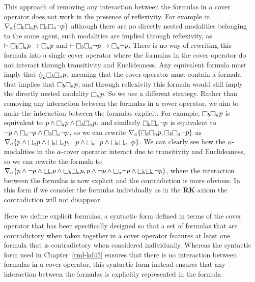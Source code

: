 This approach of removing any interaction between the formulas in a cover operator does not work in the presence of reflexivity.
For example in $\coversA \{\necessaryB \necessaryA \atomP, \necessaryB \necessaryA \lnot \atomP\}$ although there are no directly nested modalities belonging to the same agent, such modalities are implied through reflexivity, as $\proves \necessaryB \necessaryA \atomP \implies \necessaryA \atomP$ and $\proves \necessaryB \necessaryA \lnot \atomP \implies \necessaryA \lnot \atomP$.
There is no way of rewriting this formula into a single cover operator where the formulas in the cover operator do not interact through transitivity and Euclideaness. 
Any equivalent formula must imply that $\possibleA \necessaryB \necessaryA \atomP$, meaning that the cover operator must contain a formula that implies that $\necessaryB \necessaryA \atomP$, and through reflexivity this formula would still imply the directly nested modality $\necessaryA \atomP$.
So we use a different strategy.
Rather than removing any interaction between the formulas in a cover operator, we aim to make the interaction between the formulas explicit.
For example, $\necessaryB \necessaryA \atomP$ is equivalent to $\atomP \land \necessaryA \atomP \land \necessaryB \necessaryA \atomP$, and similarly $\necessaryB \necessaryA \lnot \atomP$ is equivalent to $\lnot \atomP \land \necessaryA \lnot \atomP \land \necessaryB \necessaryA \lnot \atomP$, so we can rewrite $\coversA \{\necessaryB \necessaryA \atomP, \necessaryB \necessaryA \lnot \atomP\}$ as $\coversA \{\atomP \land \necessaryA \atomP \land \necessaryB \necessaryA \atomP, \lnot \atomP \land \necessaryA \lnot \atomP \land \necessaryB \necessaryA \lnot \atomP\}$.
We can clearly see how the $a$-modalities in the $a$-cover operator interact due to transitivity and Euclideaness, so we can rewrite the formula to 
$\coversA \{\atomP \land \lnot \atomP \land \necessaryA \atomP \land \necessaryB \necessaryA \atomP, \atomP \land \lnot \atomP \land \necessaryA \lnot \atomP \land \necessaryB \necessaryA \lnot \atomP\}$, where the interaction between the formulas is now explicit and the contradiction is more obvious.
In this form if we consider the formulas individually as in the {\bf RK} axiom the contradiction will not disappear.

Here we define explicit formulas, a syntactic form defined in terms of the cover operator that has been specifically designed so that a set of formulas that are contradictory when taken together in a cover operator features at least one formula that is contradictory when considered individually.
Whereas the syntactic form used in Chapter~\ref{rml-kd45} ensures that there is no interaction between formulas in a cover operator, this syntactic form instead ensures that any interaction between the formulas is explicitly represented in the formula.

